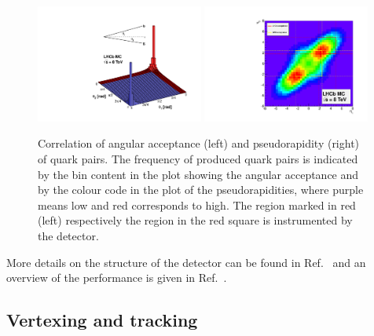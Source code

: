 \begin{figure}[htb]
\centering
\includegraphics[width=0.49\textwidth]{04-Detector/figs/bbbarcorrelation.pdf}
\includegraphics[width=0.49\textwidth]{04-Detector/figs/bbbaracceptance.pdf}
\caption{Correlation of angular acceptance (left) and pseudorapidity (right)
of \bbbar quark pairs. The frequency of produced \bbbar quark pairs is
indicated by the bin content in the plot showing the angular acceptance and by
the colour code in the plot of the pseudorapidities, where purple means low
and red corresponds to high. The region marked in red (left) respectively the
region in the red square is instrumented by the \lhcb detector.}
\label{fig:detector:bbbar}
\end{figure}

More details on the structure of the \lhcb detector can be found in
Ref.~\cite{Alves:2008zz} and an overview of the performance is given in
Ref.~\cite{LHCb-DP-2014-002}.

\subsection*{Vertexing and tracking}
\label{subsec:tracker}

